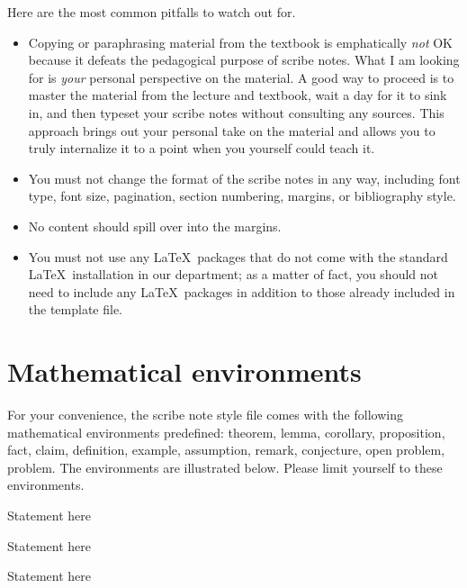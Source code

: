\documentclass[usletter]{article}
\begin{document}
Here are the most common pitfalls to watch out for.

\begin{itemize}
\item Copying or paraphrasing material from the
textbook is emphatically \emph{not} OK because it
defeats the pedagogical purpose of scribe notes.  What
I am looking for is \emph{your} personal perspective on
the material. A good way to proceed is to master the
material from the lecture and textbook, wait a day
for it to sink in, and then typeset your scribe notes
without consulting any sources. This approach brings
out your personal take on the material and allows you
to truly internalize it to a point when you yourself
could teach it.

\item You must not change the format of the scribe
notes in any way, including font type, font size,
pagination, section numbering, margins, or bibliography
style.

\item No content should spill over into the margins.

\item You must not use any \LaTeX\ packages that do not
come with the standard \LaTeX\ installation in our
department; as a matter of fact, you should not need to
include any \LaTeX\ packages in addition to those
already included in the template file.
\end{itemize}


\section{Mathematical environments}

For your convenience, the scribe note style file comes
with the following mathematical environments
predefined: theorem, lemma, corollary, proposition,
fact, claim, definition, example, assumption, remark,
conjecture, open problem, problem. The environments are
illustrated below.  Please limit yourself to these
environments.

\begin{theorem}
Statement here
\end{theorem}

\begin{lemma}
Statement here
\end{lemma}

\begin{corollary}
Statement here
\end{corollary}
\end{document}
